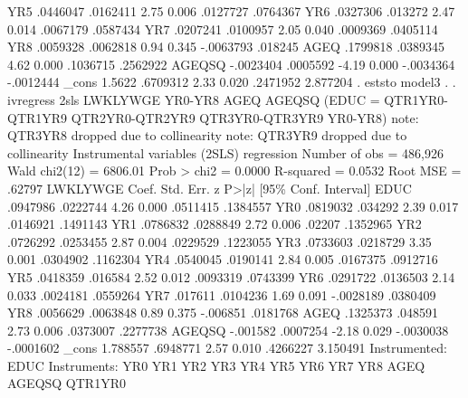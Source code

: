          YR5 {\VBAR}   .0446047   .0162411     2.75   0.006     .0127727    .0764367
         YR6 {\VBAR}   .0327306    .013272     2.47   0.014     .0067179    .0587434
         YR7 {\VBAR}   .0207241   .0100957     2.05   0.040     .0009369    .0405114
         YR8 {\VBAR}   .0059328   .0062818     0.94   0.345    -.0063793     .018245
        AGEQ {\VBAR}   .1799818   .0389345     4.62   0.000     .1036715    .2562922
      AGEQSQ {\VBAR}  -.0023404   .0005592    -4.19   0.000    -.0034364   -.0012444
       _cons {\VBAR}     1.5622   .6709312     2.33   0.020     .2471952    2.877204
{\smallskip}
. eststo model3
{\smallskip}
. 
. ivregress 2sls LWKLYWGE YR0-YR8 AGEQ AGEQSQ (EDUC = QTR1YR0-QTR1YR9 QTR2YR0-QTR2YR9 QTR3YR0-QTR3YR9 YR0-YR8)
note: QTR3YR8 dropped due to collinearity
note: QTR3YR9 dropped due to collinearity
{\smallskip}
Instrumental variables (2SLS) regression          Number of obs   =    486,926
                                                  Wald chi2(12)   =    6806.01
                                                  Prob > chi2     =     0.0000
                                                  R-squared       =     0.0532
                                                  Root MSE        =     .62797
{\smallskip}
    LWKLYWGE {\VBAR}      Coef.   Std. Err.      z    P>|z|     [95\% Conf. Interval]
        EDUC {\VBAR}   .0947986   .0222744     4.26   0.000     .0511415    .1384557
         YR0 {\VBAR}   .0819032    .034292     2.39   0.017     .0146921    .1491143
         YR1 {\VBAR}   .0786832   .0288849     2.72   0.006       .02207    .1352965
         YR2 {\VBAR}   .0726292   .0253455     2.87   0.004     .0229529    .1223055
         YR3 {\VBAR}   .0733603   .0218729     3.35   0.001     .0304902    .1162304
         YR4 {\VBAR}   .0540045   .0190141     2.84   0.005     .0167375    .0912716
         YR5 {\VBAR}   .0418359    .016584     2.52   0.012     .0093319    .0743399
         YR6 {\VBAR}   .0291722   .0136503     2.14   0.033     .0024181    .0559264
         YR7 {\VBAR}    .017611   .0104236     1.69   0.091    -.0028189    .0380409
         YR8 {\VBAR}   .0056629   .0063848     0.89   0.375     -.006851    .0181768
        AGEQ {\VBAR}   .1325373    .048591     2.73   0.006     .0373007    .2277738
      AGEQSQ {\VBAR}   -.001582   .0007254    -2.18   0.029    -.0030038   -.0001602
       _cons {\VBAR}   1.788557   .6948771     2.57   0.010     .4266227    3.150491
Instrumented:  EDUC
Instruments:   YR0 YR1 YR2 YR3 YR4 YR5 YR6 YR7 YR8 AGEQ AGEQSQ QTR1YR0
